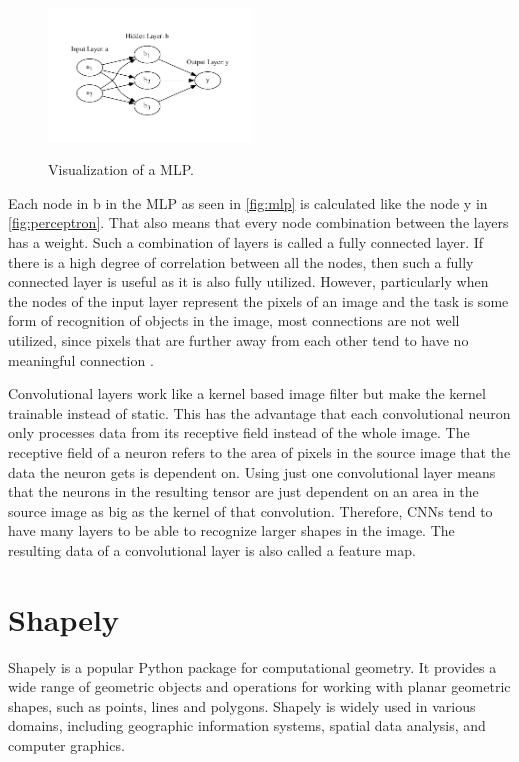 \documentclass[10pt]{book}
\newcommand{\figureref}[1]{\autoref{#1}}
\begin{document}
\begin{figure}
  \caption{Visualization of a \ac{MLP}.}
  \includegraphics[width=0.48\textwidth]{graph/mlp}
  \label{fig:mlp} 
\end{figure}

Each node in b in the \ac{MLP} as seen in \figureref{fig:mlp} is calculated like the node y in \figureref{fig:perceptron}. That also means that every node combination between the layers has a weight. Such a combination of layers is called a fully connected layer. If there is a high degree of correlation between all the nodes, then such a fully connected layer is useful as it is also fully utilized. However, particularly when the nodes of the input layer represent the pixels of an image and the task is some form of recognition of objects in the image, most connections are not well utilized, since pixels that are further away from each other tend to have no meaningful connection \cite{aghdam2017guide}.

Convolutional layers work like a kernel based image filter but make the kernel trainable instead of static. This has the advantage that each convolutional neuron only processes data from its receptive field instead of the whole image. The receptive field of a neuron refers to the area of pixels in the source image that the data the neuron gets is dependent on. Using just one convolutional layer means that the neurons in the resulting tensor are just dependent on an area in the source image as big as the kernel of that convolution. Therefore, \acp{CNN} tend to have many layers to be able to recognize larger shapes in the image. The resulting data of a convolutional layer is also called a feature map. 

\section{Shapely} %

Shapely is a popular Python package for computational geometry. It provides a wide range of geometric objects and operations for working with planar geometric shapes, such as points, lines and polygons. Shapely is widely used in various domains, including geographic information systems, spatial data analysis, and computer graphics.
\end{document}
